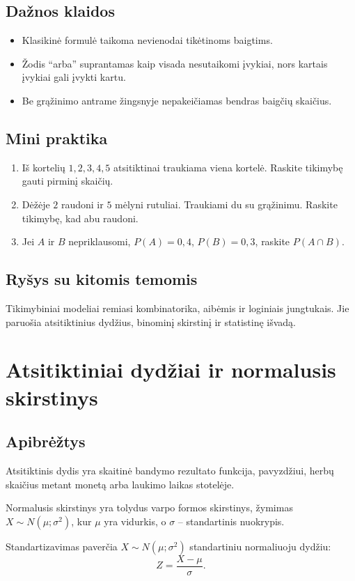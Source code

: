 \subsection{Dažnos klaidos}
\begin{itemize}
\item Klasikinė formulė taikoma nevienodai tikėtinoms baigtims.
\item Žodis ``arba'' suprantamas kaip visada nesutaikomi įvykiai, nors kartais įvykiai gali įvykti kartu.
\item Be grąžinimo antrame žingsnyje nepakeičiamas bendras baigčių skaičius.
\end{itemize}

\subsection{Mini praktika}
\begin{enumerate}[label=\alph*)]
\item Iš kortelių \(1,2,3,4,5\) atsitiktinai traukiama viena kortelė. Raskite tikimybę gauti pirminį skaičių.
\item Dėžėje \(2\) raudoni ir \(5\) mėlyni rutuliai. Traukiami du su grąžinimu. Raskite tikimybę, kad abu raudoni.
\item Jei \(A\) ir \(B\) nepriklausomi, \(P(A)=0{,}4\), \(P(B)=0{,}3\), raskite \(P(A\cap B)\).
\end{enumerate}

\subsection{Ryšys su kitomis temomis}
Tikimybiniai modeliai remiasi kombinatorika, aibėmis ir loginiais jungtukais. Jie paruošia atsitiktinius dydžius, binominį skirstinį ir statistinę išvadą.

\section{Atsitiktiniai dydžiai ir normalusis skirstinys}\label{sec:atsitiktiniai-dydziai-ir-normalusis-skirstinys}

\subsection{Apibrėžtys}
\begin{apibreztis}
Atsitiktinis dydis yra skaitinė bandymo rezultato funkcija, pavyzdžiui, herbų skaičius metant monetą arba laukimo laikas stotelėje.
\end{apibreztis}
\begin{apibreztis}
Normalusis skirstinys yra tolydus varpo formos skirstinys, žymimas \(X\sim N(\mu;\sigma^2)\), kur \(\mu\) yra vidurkis, o \(\sigma\) -- standartinis nuokrypis.
\end{apibreztis}
\begin{apibreztis}
Standartizavimas paverčia \(X\sim N(\mu;\sigma^2)\) standartiniu normaliuoju dydžiu:
\[
Z=\frac{X-\mu}{\sigma}.
\]
\end{apibreztis}


